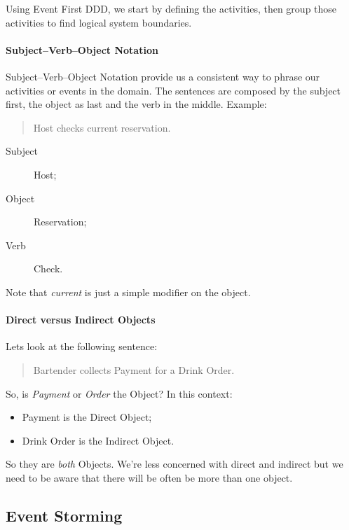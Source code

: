 Using Event First DDD, we start by defining the activities, then group those activities to find logical system boundaries.

\paragraph{Subject--Verb--Object Notation}
Subject--Verb--Object Notation provide us a consistent way to phrase our activities or events in the domain.
The sentences are composed by the subject first, the object as last and the verb in the middle. Example:

\begin{quote}
    Host checks current reservation.
\end{quote}
\begin{description}
    \item[Subject] Host;
    \item[Object] Reservation;
    \item[Verb] Check.
\end{description}

Note that \emph{current} is just a simple modifier on the object.

\paragraph{Direct versus Indirect Objects}

Lets look at the following sentence:
\begin{quote}
    Bartender collects Payment for a Drink Order.
\end{quote}

So, is \emph{Payment} or \emph{Order} the Object? 
In this context:
\begin{itemize}
    \item Payment is the Direct Object;
    \item Drink Order is the Indirect Object.
\end{itemize}

So they are \emph{both} Objects. We're less concerned with direct and indirect but we need to be aware that there will be often be more than one object. 

\subsection{Event Storming}

